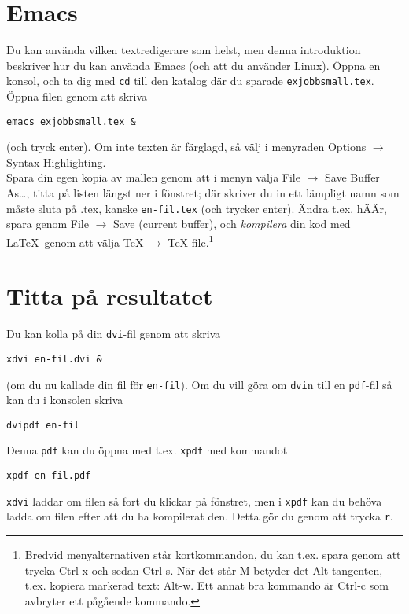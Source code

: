 \documentclass[11pt,a4paper]{article}
\begin{document}
\section{Emacs}\label{om_text}

Du kan använda vilken textredigerare som helst, men denna introduktion beskriver hur du kan använda Emacs (och att du använder Linux). Öppna en konsol, och ta dig med \texttt{cd} till den katalog där du sparade \texttt{exjobbsmall.tex}. Öppna filen genom att skriva
\begin{verbatim}
emacs exjobbsmall.tex &
\end{verbatim}
(och tryck enter). Om inte texten är färglagd, så välj i menyraden Options $\to$ Syntax Highlighting.\\

Spara din egen kopia av mallen genom att i menyn välja File $\to$ Save Buffer As\dots, titta på listen längst ner i fönstret; där skriver du in ett lämpligt namn som måste sluta på .tex, kanske \texttt{en-fil.tex} (och trycker enter). Ändra t.ex. hÄÄr, spara genom File $\to$ Save (current buffer), och \textit{kompilera} din kod med \LaTeX\ genom att välja TeX $\to$ TeX file.\footnote{Bredvid menyalternativen står kortkommandon, du kan t.ex. spara genom att trycka Ctrl-x och sedan Ctrl-s. När det står M betyder det Alt-tangenten, t.ex. kopiera markerad text: Alt-w. Ett annat bra kommando är Ctrl-c som avbryter ett pågående kommando.}



\section{Titta på resultatet}\label{dvi_och_pdf}

Du kan kolla på din \texttt{dvi}-fil genom att skriva
\begin{verbatim}
xdvi en-fil.dvi &
\end{verbatim}
(om du nu kallade din fil för \texttt{en-fil}). Om du vill göra om \texttt{dvi}n till en \texttt{pdf}-fil så kan du i konsolen skriva
\begin{verbatim}
dvipdf en-fil
\end{verbatim}
Denna \texttt{pdf} kan du öppna med t.ex. \texttt{xpdf} med kommandot
\begin{verbatim}
xpdf en-fil.pdf
\end{verbatim}
\texttt{xdvi} laddar om filen så fort du klickar på fönstret, men i \texttt{xpdf} kan du behöva ladda om filen efter att du ha kompilerat den. Detta gör du genom att trycka \texttt{r}.
\end{document}
